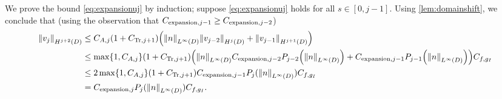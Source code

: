 We prove the bound \cref{eq:expansionuj} by induction; suppose \cref{eq:expansionuj} holds for all $s \in [0,j-1].$ Using \cref{lem:domainshift}, we conclude that (using the observation that $C_{\mathrm{expansion},j-1} \geq C_{\mathrm{expansion},j-2}$)
\begin{align*}
\NHfn{j+2}{D}{\vj} &\leq \CAj \mleft(1+\CTrjpo\mright)\mleft(\NLiD{n} \NHfn{j}{D}{\vfn{j-2}} + \NHfn{j+1}{D}{\vfn{j-1}}\mright)\\
&\leq \max\set{1,\CAj} \mleft(1+\CTrjpo\mright)\mleft(\NLiD{n} \Cefn{j-2} \Pfn{j-2}\mleft(\NLiD{n}\mright) + \Cefn{j-1} \Pfn{j-1}\mleft(\NLiD{n}\mright)\mright)\Cfg\\
&\leq 2\max\set{1,\CAj} \mleft(1+\CTrjpo\mright)\Cefn{j-1} \Pfn{j}(\NLiD{n})\Cfg\\
&= \Cefn{j} \Pfn{j}(\NLiD{n})\Cfg.
\end{align*}

